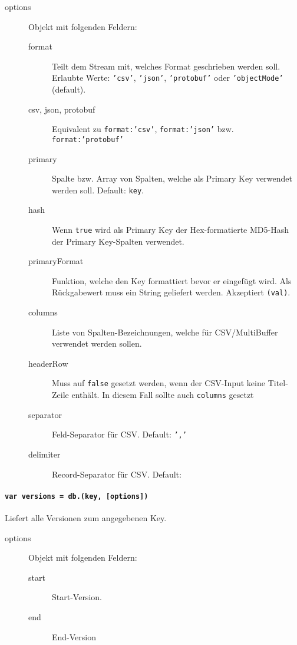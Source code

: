 \begin{description}
\item[options] Objekt mit folgenden Feldern:
    \begin{description}
    \item[format] Teilt dem Stream mit, welches Format geschrieben werden soll. Erlaubte Werte: \texttt{'csv'}, \texttt{'json'}, \texttt{'protobuf'} oder \texttt{'objectMode'} (default).
    \item[csv, json, protobuf] Equivalent zu \texttt{format:'csv'}, \texttt{format:'json'} bzw. \texttt{format:'protobuf'}
    \item[primary] Spalte bzw. Array von Spalten, welche als Primary Key verwendet werden soll. Default: \texttt{key}.
    \item[hash] Wenn \texttt{true} wird als Primary Key der Hex-formatierte MD5-Hash der Primary Key-Spalten verwendet.
    \item[primaryFormat] Funktion, welche den Key formattiert bevor er eingefügt wird. Als Rückgabewert muss ein String geliefert werden. Akzeptiert \texttt{(val)}.
    \item[columns] Liste von Spalten-Bezeichnungen, welche für CSV/MultiBuffer verwendet werden sollen.
    \item[headerRow] Muss auf \texttt{false} gesetzt werden, wenn der CSV-Input keine Titel-Zeile enthält. In diesem Fall sollte auch \texttt{columns} gesetzt
    \item[separator] Feld-Separator für CSV. Default: \texttt{','}
    \item[delimiter] Record-Separator für CSV. Default: 
    \end{description}
\end{description}


\paragraph{\texttt{var versions = db.(key, [options])}}
Liefert alle Versionen zum angegebenen Key.
\begin{description}
\item[options] Objekt mit folgenden Feldern:
    \begin{description}
    \item[start] Start-Version.
    \item[end] End-Version
    \end{description}
\end{description}

